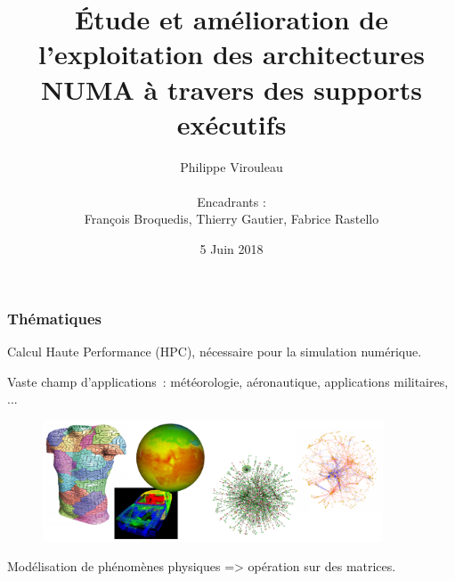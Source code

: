 \documentclass[xcolor={usenames,dvipsnames,svgnames,table}, aspectratio=43]{beamer}
\title[Soutenance de thèse]{Étude et amélioration de l'exploitation des architectures NUMA à travers des supports exécutifs
  \vspace{-25pt}
}
\author[Philippe Virouleau]{
Philippe Virouleau\\
  ~\\
\small Encadrants :\\
François Broquedis, Thierry Gautier, Fabrice Rastello}
\institute[CORSE/AVALON]{Inria - CORSE/AVALON teams}
\date{5 Juin 2018}
\begin{document}








\mymaketitle

\begin{frame}
\frametitle{Thématiques}

  Calcul Haute Performance (HPC), nécessaire pour la simulation numérique.

  Vaste champ d'applications~: météorologie, aéronautique, applications militaires, ...

  \begin{figure}
    \includegraphics[width=0.9\textwidth]{graph/simulation.pdf}
  \end{figure}


  Modélisation de phénomènes physiques => opération sur des matrices.
\end{frame}
\end{document}
